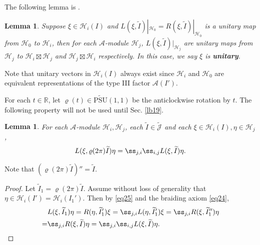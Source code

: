 \documentclass[11pt,b5paper,notitlepage]{article}
\theoremstyle{definition}
\theoremstyle{plain}
\newtheorem{lm}[df]{Lemma}
\newcommand{\mc}{\mathcal}
\newcommand{\wtd}{\widetilde}
\newcommand{\Jtd}{\widetilde{\mathcal J}}
\newcommand{\Rbb}{\mathbb R}
\newcommand{\UPSU}{\widetilde{\mathrm{PSU}}(1,1)}
\numberwithin{equation}{section}
\begin{document}
	
The following lemma is \cite[Lemma 6.1]{Gui21a}.
\begin{lm}\label{lb2}
Suppose $\xi\in\mc H_i(I)$ and $L(\xi,\wtd I)|_{\mc H_0}=R(\xi,\wtd I)|_{\mc H_0}$ is a unitary map from $\mc H_0$ to $\mc H_i$, then for each $\mc A$-module $\mc H_j$, $L(\xi,\wtd I)|_{\mc H_j}$ are unitary maps from $\mc H_j$ to $\mc H_i\boxtimes\mc H_j$ and $\mc H_j\boxtimes\mc H_i$ respectively. In this case, we say $\xi$ is \textbf{unitary}.
\end{lm}

Note that unitary vectors in $\mc H_i(I)$ always exist since $\mc H_i$ and $\mc H_0$ are equivalent representations of the  type III factor $\mc A(I')$.


For each $t\in\Rbb$, let $\varrho(t)\in\UPSU$ be the anticlockwise rotation by $t$. The following property will not be used until Sec. \ref{lb19}.

\begin{lm}\label{lb20}
For each $\mc A$-module $\mc H_i,\mc H_j$, each $\wtd I\in\Jtd$  and each $\xi\in\mc H_i(I),\eta\in\mc H_j$,
\begin{align}
L(\xi,\varrho(2\pi)\wtd I)\eta=\ss_{j,i}\ss_{i,j}L(\xi,\wtd I)\eta.	
\end{align}
\end{lm}

Note that $(\varrho(2\pi)\wtd I)''=\wtd I$.

\begin{proof}
Let $\wtd I_1=\varrho(2\pi)\wtd I$. Assume without loss of generality that $\eta\in\mc H_i(I')=\mc H_i(I_1')$. Then by \eqref{eq25} and the braiding axiom \eqref{eq24},
\begin{align*}
&L(\xi,\wtd I_1)\eta=R(\eta,\wtd I_1')\xi=\ss_{j,i}L(\eta,\wtd I_1')\xi=\ss_{j,i}R(\xi,\wtd I_1'')\eta\\
=&\ss_{j,i}R(\xi,\wtd I)\eta=\ss_{j,i}\ss_{i,j}L(\xi,\wtd I)\eta.
\end{align*}
\end{proof}
\end{document}
